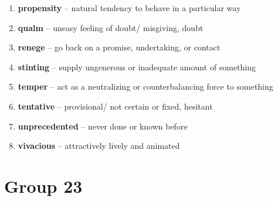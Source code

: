 \begin{enumerate}[wide,labelindent=0pt]
\item \textbf{propensity} -- natural tendency to behave in a particular way
\item \textbf{qualm} -- uneasy feeling of doubt/ misgiving, doubt
\item \textbf{renege} -- go back on a promise, undertaking, or contact
\item \textbf{stinting} -- supply ungenerous or inadequate amount of something
\item \textbf{temper} -- act as a neutralizing or counterbalancing force to something
\item \textbf{tentative} -- provisional/ not certain or fixed, hesitant
\item \textbf{unprecedented} -- never done or known before
\item \textbf{vivacious} -- attractively lively and animated
\end{enumerate}

\newpage
\section{Group 23}

